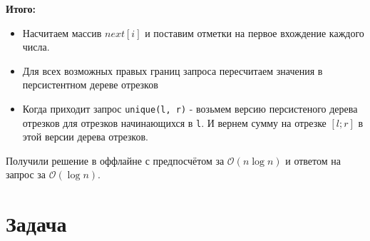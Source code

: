 \documentclass{article}
\begin{document}
\textbf{Итого:}
\begin{itemize}
\item Насчитаем массив $next[i]$ и поставим отметки на первое вхождение каждого числа.
\item Для всех возможных правых границ запроса пересчитаем значения в персистентном дереве отрезков
\item Когда приходит запрос \texttt{unique(l, r)} - возьмем версию персистеного дерева отрезков для отрезков начинающихся в \texttt{l}. И вернем сумму на отрезке $[l; r]$ в этой версии дерева отрезков.
\end{itemize}
Получили решение в оффлайне с предпосчётом за $\mathcal{O}(n \log n)$ и ответом на запрос за $\mathcal{O}(\log n)$.
\section*{Задача }
\end{document}
